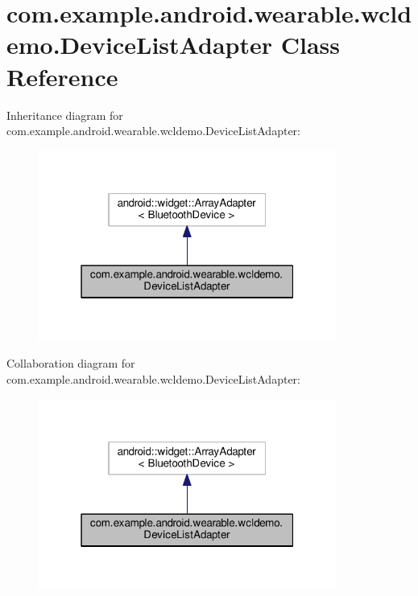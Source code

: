 \hypertarget{classcom_1_1example_1_1android_1_1wearable_1_1wcldemo_1_1DeviceListAdapter}{}\section{com.\+example.\+android.\+wearable.\+wcldemo.\+Device\+List\+Adapter Class Reference}
\label{classcom_1_1example_1_1android_1_1wearable_1_1wcldemo_1_1DeviceListAdapter}


Inheritance diagram for com.\+example.\+android.\+wearable.\+wcldemo.\+Device\+List\+Adapter\+:
\nopagebreak
\begin{figure}[H]
\begin{center}
\leavevmode
\includegraphics[width=277pt]{da/daf/classcom_1_1example_1_1android_1_1wearable_1_1wcldemo_1_1DeviceListAdapter__inherit__graph}
\end{center}
\end{figure}


Collaboration diagram for com.\+example.\+android.\+wearable.\+wcldemo.\+Device\+List\+Adapter\+:
\nopagebreak
\begin{figure}[H]
\begin{center}
\leavevmode
\includegraphics[width=277pt]{df/d0e/classcom_1_1example_1_1android_1_1wearable_1_1wcldemo_1_1DeviceListAdapter__coll__graph}
\end{center}
\end{figure}
